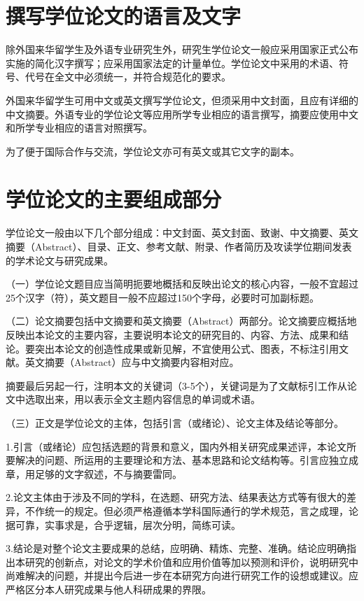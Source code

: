 \documentclass[a4paper,12pt,oneside,openany]{book}
\begin{document}
\section{撰写学位论文的语言及文字}

除外国来华留学生及外语专业研究生外，研究生学位论文一般应采用国家正式公布实施的简化汉字撰写；应采用国家法定的计量单位。学位论文中采用的术语、符号、代号在全文中必须统一，并符合规范化的要求。

外国来华留学生可用中文或英文撰写学位论文，但须采用中文封面，且应有详细的中文摘要。外语专业的学位论文等应用所学专业相应的语言撰写，摘要应使用中文和所学专业相应的语言对照撰写。

为了便于国际合作与交流，学位论文亦可有英文或其它文字的副本。


\section{学位论文的主要组成部分}

学位论文一般由以下几个部分组成：中文封面、英文封面、致谢、中文摘要、英文摘要（Abstract）、目录、正文、参考文献、附录、作者简历及攻读学位期间发表的学术论文与研究成果。

（一）学位论文题目应当简明扼要地概括和反映出论文的核心内容，一般不宜超过25个汉字（符），英文题目一般不应超过150个字母，必要时可加副标题。

（二）论文摘要包括中文摘要和英文摘要（Abstract）两部分。论文摘要应概括地反映出本论文的主要内容，主要说明本论文的研究目的、内容、方法、成果和结论。要突出本论文的创造性成果或新见解，不宜使用公式、图表，不标注引用文献。英文摘要（Abstract）应与中文摘要内容相对应。

摘要最后另起一行，注明本文的关键词（3-5个），关键词是为了文献标引工作从论文中选取出来，用以表示全文主题内容信息的单词或术语。

（三）正文是学位论文的主体，包括引言（或绪论）、论文主体及结论等部分。

1.引言（或绪论）应包括选题的背景和意义，国内外相关研究成果述评，本论文所要解决的问题、所运用的主要理论和方法、基本思路和论文结构等。引言应独立成章，用足够的文字叙述，不与摘要雷同。

2.论文主体由于涉及不同的学科，在选题、研究方法、结果表达方式等有很大的差异，不作统一的规定。但必须严格遵循本学科国际通行的学术规范，言之成理，论据可靠，实事求是，合乎逻辑，层次分明，简练可读。

3.结论是对整个论文主要成果的总结，应明确、精炼、完整、准确。结论应明确指出本研究的创新点，对论文的学术价值和应用价值等加以预测和评价，说明研究中尚难解决的问题，并提出今后进一步在本研究方向进行研究工作的设想或建议。应严格区分本人研究成果与他人科研成果的界限。
\end{document}
